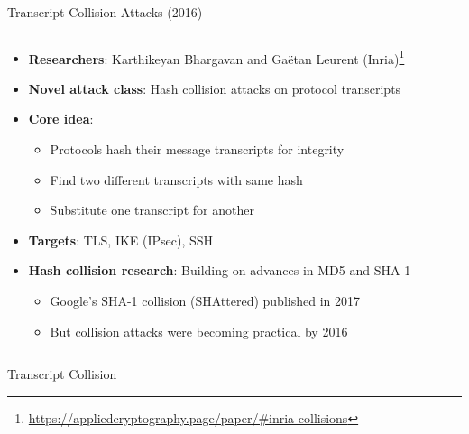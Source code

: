 \documentclass[aspectratio=169, lualatex, handout]{beamer}
\begin{document}
\begin{frame}{Transcript Collision Attacks (2016)}
	\begin{columns}[c]
		\begin{column}{1\textwidth}
			\begin{itemize}[<+->]
				\item \textbf{Researchers}: Karthikeyan Bhargavan and Gaëtan Leurent (Inria)\footnote{\url{https://appliedcryptography.page/paper/\#inria-collisions}}
				\item \textbf{Novel attack class}: Hash collision attacks on protocol transcripts
				\item \textbf{Core idea}:
				      \begin{itemize}
					      \item Protocols hash their message transcripts for integrity
					      \item Find two different transcripts with same hash
					      \item Substitute one transcript for another
				      \end{itemize}
				\item \textbf{Targets}: TLS, IKE (IPsec), SSH
				\item \textbf{Hash collision research}: Building on advances in MD5 and SHA-1
				      \begin{itemize}
					      \item Google's SHA-1 collision (SHAttered) published in 2017
					      \item But collision attacks were becoming practical by 2016
				      \end{itemize}
			\end{itemize}
		\end{column}
	\end{columns}
\end{frame}

\begin{frame}{Transcript Collision}
\end{frame}
\end{document}
